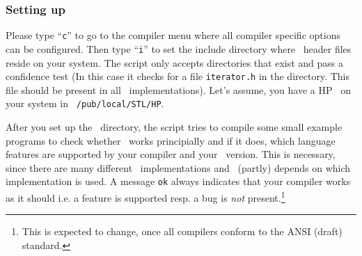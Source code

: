 \subsubsection{Setting up \stl}

Please type ``{\tt c}'' to go to the compiler menu where all compiler
specific options can be configured. Then type ``{\tt i}'' to set the
include directory where \stl\ header files reside on your system. The
script only accepts directories that exist and pass a confidence test
(In this case it checks for a file {\tt iterator.h} in the directory.
This file should be present in all \stl\ implementations). Let's
assume, you have a {\sc HP} \stl\ on your system in {\tt
  /pub/local/STL/HP}.

After you set up the \stl\ directory, the script tries to compile some
small example programs to check whether \stl\ works principially and
if it does, which language features are supported by your compiler and
your \stl\ version. This is necessary, since there are many different
\stl\ implementations and \cgal\ (partly) depends on which
implementation is used. A message {\tt ok} always indicates that your
compiler works as it should i.e. a feature is supported resp. a bug is
{\it not} present.\footnote{This is expected to change, once all
  compilers conform to the ANSI (draft) standard.}

